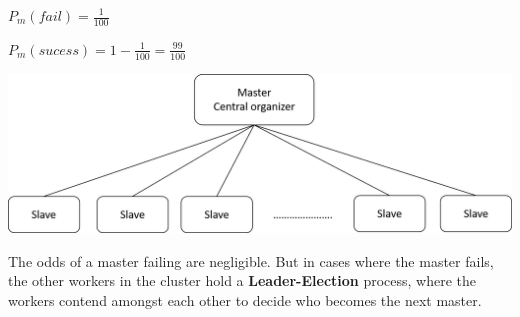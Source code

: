\documentclass[twoside]{article}
\begin{document}
\centerline{$P_m (fail) =  \frac{1}{100}$}
\centerline{$P_m (sucess) =  1 - \frac{1}{100} = \frac{99}{100}$}


\includegraphics[scale=0.2]{Scribe-Drawings-MasterSlave.png}


The odds of a master failing are negligible. But in cases where the master fails, the other workers in the cluster hold a  \textbf{Leader-Election} process, where the workers contend amongst each other to decide who becomes the next master. 
\end{document}
